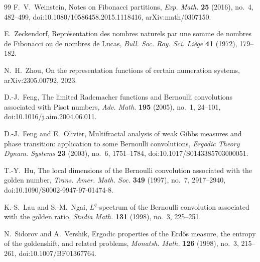\begin{thebibliography}{99}
F.~V.~Weinstein,
Notes on Fibonacci partitions,
\textit{Exp. Math.} \textbf{25} (2016), no.~4, 482--499,
doi:10.1080/10586458.2015.1118416, arXiv:math/0307150.

E.~Zeckendorf,
Repr\'esentation des nombres naturels par une somme de nombres de Fibonacci ou
de nombres de Lucas,
\textit{Bull. Soc. Roy. Sci. Li\`ege} \textbf{41} (1972), 179--182.

N.~H.~Zhou,
On the representation functions of certain numeration systems,
arXiv:2305.00792, 2023.

D.-J.~Feng,
The limited Rademacher functions and Bernoulli convolutions associated with
Pisot numbers,
\textit{Adv. Math.} \textbf{195} (2005), no.~1, 24--101,
doi:10.1016/j.aim.2004.06.011.

D.-J.~Feng and E.~Olivier,
Multifractal analysis of weak Gibbs measures and phase transition:
application to some Bernoulli convolutions,
\textit{Ergodic Theory Dynam. Systems} \textbf{23} (2003), no.~6,
1751--1784, doi:10.1017/S0143385703000051.

T.-Y.~Hu,
The local dimensions of the Bernoulli convolution associated with the golden
number,
\textit{Trans. Amer. Math. Soc.} \textbf{349} (1997), no.~7, 2917--2940,
doi:10.1090/S0002-9947-97-01474-8.

K.-S.~Lau and S.-M.~Ngai,
\(L^q\)-spectrum of the Bernoulli convolution associated with the golden
ratio,
\textit{Studia Math.} \textbf{131} (1998), no.~3, 225--251.

N.~Sidorov and A.~Vershik,
Ergodic properties of the Erd\H{o}s measure, the entropy of the goldenshift,
and related problems,
\textit{Monatsh. Math.} \textbf{126} (1998), no.~3, 215--261,
doi:10.1007/BF01367764.

\end{thebibliography}
